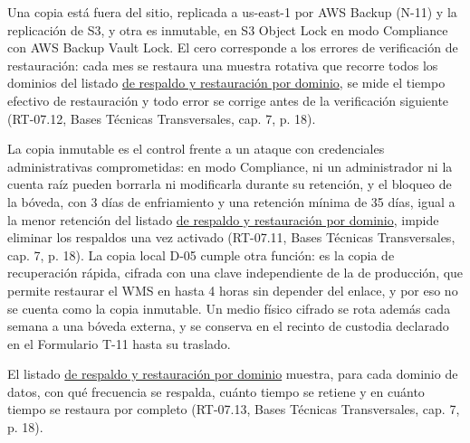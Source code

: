 Una copia está fuera del sitio, replicada a us-east-1 por AWS Backup (N-11) y la replicación de S3, y otra es inmutable, en S3 Object Lock en modo Compliance con AWS Backup Vault Lock. El cero corresponde a los errores de verificación de restauración: cada mes se restaura una muestra rotativa que recorre todos los dominios del listado \hyperref[tab:jd12]{de respaldo y restauración por dominio}, se mide el tiempo efectivo de restauración y todo error se corrige antes de la verificación siguiente (RT-07.12, Bases Técnicas Transversales, cap. 7, p. 18).

La copia inmutable es el control frente a un ataque con credenciales administrativas comprometidas: en modo Compliance, ni un administrador ni la cuenta raíz pueden borrarla ni modificarla durante su retención, y el bloqueo de la bóveda, con 3 días de enfriamiento y una retención mínima de 35 días, igual a la menor retención del listado \hyperref[tab:jd12]{de respaldo y restauración por dominio}, impide eliminar los respaldos una vez activado (RT-07.11, Bases Técnicas Transversales, cap. 7, p. 18). La copia local D-05 cumple otra función: es la copia de recuperación rápida, cifrada con una clave independiente de la de producción, que permite restaurar el WMS en hasta 4 horas sin depender del enlace, y por eso no se cuenta como la copia inmutable. Un medio físico cifrado se rota además cada semana a una bóveda externa, y se conserva en el recinto de custodia declarado en el Formulario T-11 hasta su traslado.

El listado \hyperref[tab:jd12]{de respaldo y restauración por dominio} muestra, para cada dominio de datos, con qué frecuencia se respalda, cuánto tiempo se retiene y en cuánto tiempo se restaura por completo (RT-07.13, Bases Técnicas Transversales, cap. 7, p. 18).

